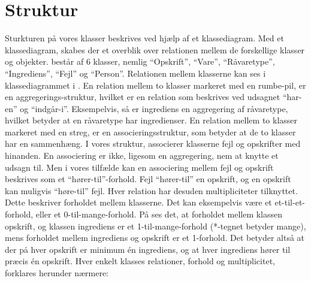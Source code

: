 \section{Struktur}
\label{sec:struktur}

Sturkturen på vores klasser beskrives ved hjælp af et klassediagram. Med et klassediagram, skabes der et overblik over relationen mellem de forskellige klasser og objekter. \Foodl{} består af 6 klasser, nemlig ``Opskrift'', ``Vare'', ``Råvaretype'', ``Ingrediens'', ``Fejl'' og ``Person''. Relationen mellem klasserne kan ses i klassediagrammet i . En relation mellem to klasser markeret med en rumbe-pil, er en aggregerings-struktur, hvilket er en relation som beskrives ved udsagnet ``har-en'' og ``indgår-i''. Eksempelvis, så er ingrediens en aggregering af råvaretype, hvilket betyder at en råvaretype har ingredienser. En relation mellem to klasser markeret med en streg, er en associeringsstruktur, som betyder at de to klasser har en sammenhæng. I vores struktur, associerer klasserne fejl og opskrifter med hinanden. En associering er ikke, ligesom en aggregering, nem at knytte et udsagn til. Men i vores tilfælde kan en associering mellem fejl og opskrift beskrives som et ``hører-til''-forhold. Fejl ``hører-til'' en opskrift, og en opskrift kan muligvis ``høre-til'' fejl. Hver relation har desuden multipliciteter tilknyttet. Dette beskriver forholdet mellem klasserne. Det kan eksempelvis være et et-til-et-forhold, eller et 0-til-mange-forhold. På  ses det, at forholdet mellem klassen opskrift, og klassen ingrediens er et 1-til-mange-forhold (*-tegnet betyder mange), mens forholdet mellem ingrediens og opskrift er et 1-forhold. Det betyder altså at der på hver opskrift er minimum én ingrediens, og at hver ingrediens hører til præcis én opskrift. Hver enkelt klasses relationer, forhold og multiplicitet, forklares herunder nærmere:



